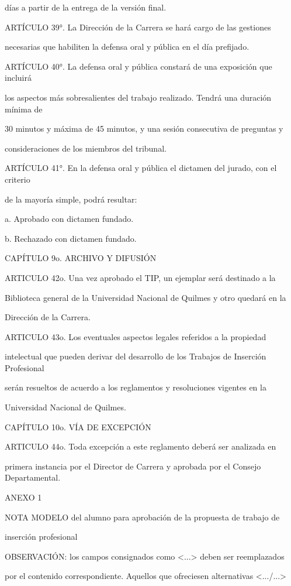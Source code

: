 \documentclass[a4paper,12pt]{article}
\begin{document}
días a partir de la entrega de la versión final.

ARTÍCULO 39°. La Dirección de la Carrera se hará cargo de las gestiones

necesarias que habiliten la defensa oral y pública en el día prefijado.

ARTÍCULO 40°. La defensa oral y pública constará de una exposición que incluirá

los aspectos más sobresalientes del trabajo realizado. Tendrá una duración mínima de

30 minutos y máxima de 45 minutos, y una sesión consecutiva de preguntas y

consideraciones de los miembros del tribunal.

ARTÍCULO 41°. En la defensa oral y pública el dictamen del jurado, con el criterio

de la mayoría simple, podrá resultar: 

a. Aprobado con dictamen fundado.

b. Rechazado con dictamen fundado.

CAPÍTULO 9o. ARCHIVO Y DIFUSIÓN

ARTICULO 42o. Una vez aprobado el TIP, un ejemplar será destinado a la

Biblioteca general de la Universidad Nacional de Quilmes y otro quedará en la

Dirección de la Carrera. 

ARTICULO 43o. Los eventuales aspectos legales referidos a la propiedad

intelectual que pueden derivar del desarrollo de los Trabajos de Inserción Profesional

serán resueltos de acuerdo a los reglamentos y resoluciones vigentes en la

Universidad Nacional de Quilmes.

CAPÍTULO 10o. VÍA DE EXCEPCIÓN

ARTICULO 44o. Toda excepción a este reglamento deberá ser analizada en

primera instancia por el Director de Carrera y aprobada por el Consejo Departamental.

ANEXO 1

NOTA MODELO del alumno para aprobación de la propuesta de trabajo de

inserción profesional

OBSERVACIÓN: los campos consignados como <...> deben ser reemplazados

por el contenido correspondiente. Aquellos que ofreciesen alternativas <.../...>
\end{document}
